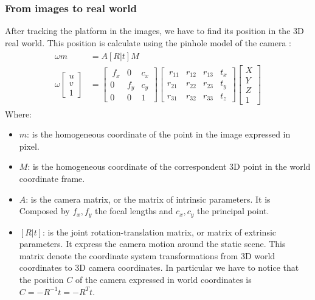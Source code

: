 \subsubsection{From images to real world}
After tracking the platform in the images, we have to find its position in the 3D real world. This position is calculate using the pinhole model of the camera \cite{weng1992camera}:
\begin{align}
\begin{split}
\omega m \ \ & = A [R|t]M \\[10pt]
{\omega \begin{bmatrix}
u \\[10pt]
v  \\[10pt]
1
\end{bmatrix}} & =
{\begin{bmatrix}\
f_x & 0 & c_x \\[10pt]
0 & f_y &c_y \\[10pt]
0 & 0 & 1
\end{bmatrix}}
{\begin{bmatrix}\
r_{11} & r_{12} & r_{13} & t_{x} \\[10pt]
r_{21} & r_{22} & r_{23} & t_{y} \\[10pt]
r_{31} & r_{32} & r_{33} & t_{z}
\end{bmatrix}}
{\begin{bmatrix}
X \\[5pt]
Y \\[5pt]
Z \\[5pt]
1
\end{bmatrix}}
\end{split}
 \label{eq:pinholemodel}
\end{align}
Where:
\begin{itemize}
 \item $m$: is the homogeneous coordinate of the point in the image expressed in pixel.
  \item $M$: is the homogeneous coordinate of the correspondent 3D point in the world coordinate frame.
 \item $A$: is the camera matrix, or the matrix of intrinsic parameters. It is Composed by $f_x,f_y$ the focal lengths and $c_x,c_y$ the principal point.
 \item $[R|t]$: is the joint rotation-translation matrix, or matrix of extrinsic parameters. It express the camera motion around the static scene. This matrix denote the coordinate system transformations from 3D world coordinates to 3D camera coordinates. In particular we have to notice that the position $C$ of the camera expressed in world coordinates is $C=-R^{{-1}}t=-R^{T}t$.
\end{itemize}

